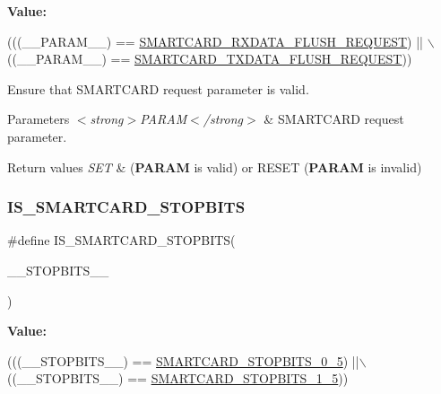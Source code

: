 {\bfseries Value\+:}
\begin{DoxyCode}
(((\_\_PARAM\_\_) == \hyperlink{group___s_m_a_r_t_c_a_r_d___request___parameters_ga99f5bbd7c32c09d0fc84ad4ec58bde26}{SMARTCARD\_RXDATA\_FLUSH\_REQUEST}) || \(\backslash\)
                                                   ((\_\_PARAM\_\_) == 
      \hyperlink{group___s_m_a_r_t_c_a_r_d___request___parameters_gab3fdde978ae746d718250e3c29b4e39d}{SMARTCARD\_TXDATA\_FLUSH\_REQUEST}))
\end{DoxyCode}


Ensure that S\+M\+A\+R\+T\+C\+A\+RD request parameter is valid. 


\begin{DoxyParams}{Parameters}
{\em $<$strong$>$\+P\+A\+R\+A\+M$<$/strong$>$} & S\+M\+A\+R\+T\+C\+A\+RD request parameter. \\
\hline
\end{DoxyParams}

\begin{DoxyRetVals}{Return values}
{\em S\+ET} & ({\bfseries P\+A\+R\+AM} is valid) or R\+E\+S\+ET ({\bfseries P\+A\+R\+AM} is invalid) \\
\hline
\end{DoxyRetVals}
\mbox{\label{group___s_m_a_r_t_c_a_r_d___private___macros_ga3295f95845b44fb5518b28685873098d}} 
\subsubsection{\texorpdfstring{I\+S\+\_\+\+S\+M\+A\+R\+T\+C\+A\+R\+D\+\_\+\+S\+T\+O\+P\+B\+I\+TS}{IS\_SMARTCARD\_STOPBITS}}
{\footnotesize\ttfamily \#define I\+S\+\_\+\+S\+M\+A\+R\+T\+C\+A\+R\+D\+\_\+\+S\+T\+O\+P\+B\+I\+TS(\begin{DoxyParamCaption}\item[{}]{\+\_\+\+\_\+\+S\+T\+O\+P\+B\+I\+T\+S\+\_\+\+\_\+ }\end{DoxyParamCaption})}

{\bfseries Value\+:}
\begin{DoxyCode}
(((\_\_STOPBITS\_\_) == \hyperlink{group___s_m_a_r_t_c_a_r_d___stop___bits_gacb1f23b1dd63c60d9823d1ec65475ae0}{SMARTCARD\_STOPBITS\_0\_5}) ||\(\backslash\)
                                             ((\_\_STOPBITS\_\_) == 
      \hyperlink{group___s_m_a_r_t_c_a_r_d___stop___bits_ga60cf2b59a8e70d1039e8ce1dcdb7c97b}{SMARTCARD\_STOPBITS\_1\_5}))
\end{DoxyCode}


